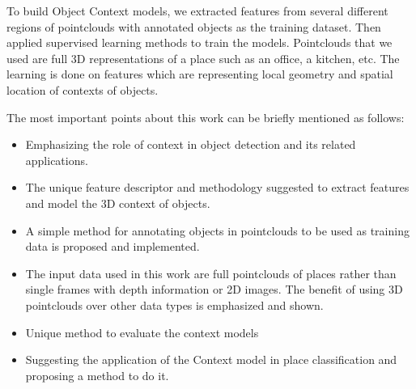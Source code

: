  To build Object Context models, we extracted features from several different regions of pointclouds with annotated objects as the training dataset. Then applied supervised learning methods to train the models. Pointclouds that we used are full 3D representations of a place such as an office, a kitchen, etc. 
 The learning is done on features which are representing local geometry and spatial location of contexts of objects.
 
 The most important points about this work can be briefly mentioned as follows:
 
 \begin{itemize}
  \item Emphasizing the role of context in object detection and its related applications.
  \item The unique feature descriptor and methodology suggested to extract features and model the 3D context of objects.
  \item A simple method for annotating objects in pointclouds to be used as training data is proposed and implemented.
  \item The input data used in this work are full pointclouds of places rather than single frames with depth information or 
  2D images. The benefit of using 3D pointclouds over other data types is emphasized and shown.
  \item Unique method to evaluate the context models
  \item Suggesting the application of the Context model in place classification and proposing a method to do it.
  
 \end{itemize}

 
